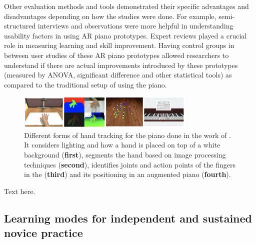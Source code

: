 \documentclass[sigchi, review]{acmart}
\begin{document}
Other evaluation methods and tools demonstrated their specific advantages and disadvantages depending on how the studies were done. For example, semi-structured interviews and observations were more helpful in understanding usability factors in using AR piano prototypes. Expert reviews played a crucial role in measuring learning and skill improvement. Having control groups in between user studies of these AR piano prototypes allowed researchers to understand if there are actual improvements introduced by these prototypes (measured by ANOVA, significant difference and other statistical tools) as compared to the traditional setup of using the piano. 



\begin{figure}[t]
    \centering
    \includegraphics[width=8.5cm]{figures/lianghandtrack.png}
    \caption{Different forms of hand tracking for the piano done in the work of \cite{liang2016barehanded}. It considers lighting and how a hand is placed on top of a white background (\textbf{first}), segments the hand based on image processing techniques (\textbf{second}), identifies joints and action points of the fingers in the (\textbf{third}) and its positioning in an augmented piano (\textbf{fourth}). }
    \label{fig:lianghandtrack}
\end{figure}

Text here. 

\subsection{Learning modes for independent and sustained novice practice}
\label{subsec: learn}
\end{document}
